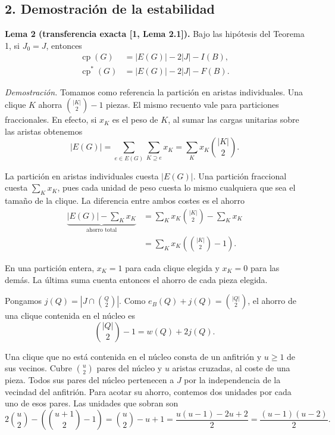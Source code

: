 \documentclass[spanish,11pt,a4paper]{article}
\begin{document}
\subsection{2. Demostración de la estabilidad}\label{demostraciuxf3n-de-la-estabilidad}

\textbf{Lema 2 (transferencia exacta {[}1, Lema 2.1{]}).} Bajo las hipótesis del Teorema 1, si \(J_0=J\), entonces
\[
\begin{aligned}
\operatorname{cp}(G)   &= |E(G)|-2|J|-I(B),\\
\operatorname{cp}^{\ast}(G) &= |E(G)|-2|J|-F(B).
\end{aligned} \tag{2}
\]

\emph{Demostración.} Tomamos como referencia la partición en aristas individuales. Una clique \(K\) ahorra \(\binom{|K|}{2}-1\) piezas. El mismo recuento vale para particiones fraccionales. En efecto, si \(x_K\) es el peso de \(K\), al sumar las cargas unitarias sobre las aristas obtenemos
\[
|E(G)|=\sum_{e\in E(G)}\sum_{K\supseteq e}x_K
       =\sum_K x_K\binom{|K|}{2}.
\]

La partición en aristas individuales cuesta \(|E(G)|\). Una partición fraccional cuesta \(\sum_K x_K\), pues cada unidad de peso cuesta lo mismo cualquiera que sea el tamaño de la clique. La diferencia entre ambos costes es el ahorro
\[
\begin{aligned}
\underbrace{|E(G)|-\sum_K x_K}_{\text{ahorro total}}
 &=\sum_K x_K\binom{|K|}{2}-\sum_K x_K\\
 &=\sum_K x_K\left(\binom{|K|}{2}-1\right).
\end{aligned}
\]

En una partición entera, \(x_K=1\) para cada clique elegida y \(x_K=0\) para las demás. La última suma cuenta entonces el ahorro de cada pieza elegida.

Pongamos \(j(Q)=|J\cap\binom{Q}{2}|\). Como \(e_B(Q)+j(Q)=\binom{|Q|}{2}\), el ahorro de una clique contenida en el núcleo es
\[
\binom{|Q|}{2}-1=w(Q)+2j(Q). \tag{3}
\]

Una clique que no está contenida en el núcleo consta de un anfitrión y \(u\ge1\) de sus vecinos. Cubre \(\binom u2\) pares del núcleo y \(u\) aristas cruzadas, al coste de una pieza. Todos sus pares del núcleo pertenecen a \(J\) por la independencia de la vecindad del anfitrión. Para acotar su ahorro, contemos dos unidades por cada uno de esos pares. Las unidades que sobran son
\[
2\binom u2-\left(\binom{u+1}{2}-1\right)
=\binom u2-u+1
=\frac{u(u-1)-2u+2}{2}
=\frac{(u-1)(u-2)}2.
\]
\end{document}
